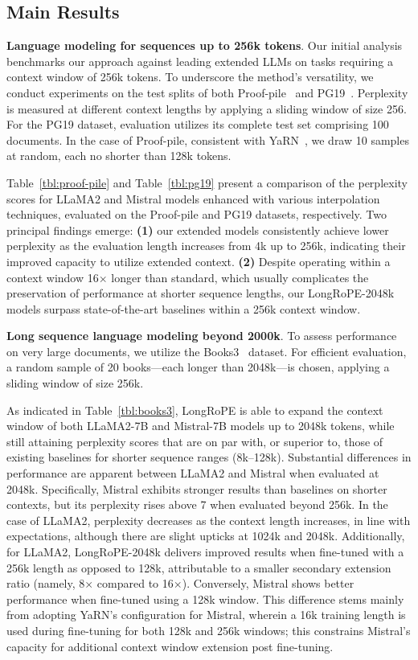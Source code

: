 \subsection{Main Results}

\label{sec:mainresult}
\textbf{Language modeling for sequences up to 256k tokens}. Our initial analysis benchmarks our approach against leading extended LLMs on tasks requiring a context window of 256k tokens. To underscore the method’s versatility, we conduct experiments on the test splits of both Proof-pile~\cite{pg19} and PG19~\cite{pile}. Perplexity is measured at different context lengths by applying a sliding window of size 256. For the PG19 dataset, evaluation utilizes its complete test set comprising 100 documents. In the case of Proof-pile, consistent with YaRN~\cite{yarn}, we draw 10 samples at random, each no shorter than 128k tokens.

Table~\ref{tbl:proof-pile} and Table~\ref{tbl:pg19} present a comparison of the perplexity scores for LLaMA2 and Mistral models enhanced with various interpolation techniques, evaluated on the Proof-pile and PG19 datasets, respectively. Two principal findings emerge: \textbf{(1)} our extended models consistently achieve lower perplexity as the evaluation length increases from 4k up to 256k, indicating their improved capacity to utilize extended context. \textbf{(2)} Despite operating within a context window 16$\times$ longer than standard, which usually complicates the preservation of performance at shorter sequence lengths, our LongRoPE-2048k models surpass state-of-the-art baselines within a 256k context window.

\textbf{Long sequence language modeling beyond 2000k}. To assess performance on very large documents, we utilize the Books3~\cite{pile} dataset. For efficient evaluation, a random sample of 20 books—each longer than 2048k—is chosen, applying a sliding window of size 256k.

As indicated in Table~\ref{tbl:books3}, LongRoPE is able to expand the context window of both LLaMA2-7B and Mistral-7B models up to 2048k tokens, while still attaining perplexity scores that are on par with, or superior to, those of existing baselines for shorter sequence ranges (8k–128k). Substantial differences in performance are apparent between LLaMA2 and Mistral when evaluated at 2048k. Specifically, Mistral exhibits stronger results than baselines on shorter contexts, but its perplexity rises above 7 when evaluated beyond 256k. In the case of LLaMA2, perplexity decreases as the context length increases, in line with expectations, although there are slight upticks at 1024k and 2048k. Additionally, for LLaMA2, LongRoPE-2048k delivers improved results when fine-tuned with a 256k length as opposed to 128k, attributable to a smaller secondary extension ratio (namely, 8$\times$ compared to 16$\times$). Conversely, Mistral shows better performance when fine-tuned using a 128k window. This difference stems mainly from adopting YaRN’s configuration for Mistral, wherein a 16k training length is used during fine-tuning for both 128k and 256k windows; this constrains Mistral’s capacity for additional context window extension post fine-tuning.

